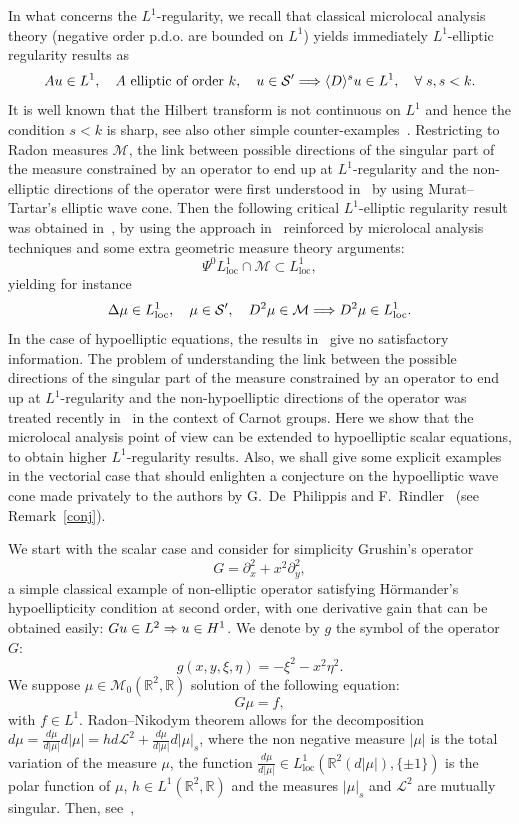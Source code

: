 \documentclass[10pt]{amsart}
\theoremstyle{definition}\newtheorem{defi}[theo]{Definition}\newtheorem{rema}[theo]{Remark}\newtheorem{exam}[theo]{Example}\newtheorem{exem}[theo]{Example}\newtheorem{nota}[theo]{Notation}
\DeclareMathOperator{\locc}{loc}
\newcommand{\bbR}{\mathbb{R}}
\newcommand{\clS}{\mathcal{S}}
\newcommand{\clM}{\mathcal{M}}
\newcommand{\clL}{\mathcal{L}}
\renewcommand*{\implies}{\mathchoice{\Longrightarrow}{\Rightarrow}{\Rightarrow}{\Rightarrow}}
\let\oldforall\forall
\renewcommand*{\forall}{\mathrel{\oldforall}}
\begin{document}
In what concerns the $L^1$-regularity, we recall that classical microlocal analysis theory (negative order p.d.o. are bounded on $L^1$) yields immediately $L^1$-elliptic regularity results as
\[
Au\in L^1,\quad A \text{ elliptic of order } k,\quad u\in \clS'\implies \langle D\rangle^s u\in L^1, \quad\forall s, s<k.
\]
It is well known that the Hilbert transform is not continuous on $L^1$ and hence the condition $s<k$ is sharp, see also other simple counter-examples~\cite[Example~7.5]{GM}. Restricting to Radon measures $\clM$, the link between possible directions of the singular part of the measure constrained by an operator to end up at $L^1$-regularity and the non-elliptic directions of the operator were first understood in~\cite{DePRi} by using Murat--Tartar's elliptic wave cone. Then the following critical $L^1$-elliptic regularity result was obtained in~\cite{BBWFL1}, by using the approach in~\cite{DePRi} reinforced by microlocal analysis techniques and some extra geometric measure theory arguments:
\begin{equation}\label{psi0L1}
\Psi^0L^1_{\locc}\cap\clM\subset L^1_{\locc},
\end{equation}
yielding for instance
\[
\Delta\mu\in L_{\locc}^1,\quad \mu\in \clS',\quad D^2\mu\in \clM\implies D^2\mu\in L^1_{\locc}.
\]
In the case of hypoelliptic equations, the results in~\cite{BBWFL1,DePRi} give no satisfactory information. The problem of understanding the link between the possible directions of the singular part of the measure constrained by an operator to end up at $L^1$-regularity and the non-hypoelliptic directions of the operator was treated recently in~\cite{A-sandwich} in the context of Carnot groups. Here we show that the microlocal analysis point of view can be extended to hypoelliptic scalar equations, to obtain higher $L^1$-regularity results. Also, we shall give some explicit examples in the vectorial case that should enlighten a conjecture on the hypoelliptic wave cone made privately to the authors by G.~De~Philippis and F.~Rindler~\cite{DePRiprep} (see Remark~\ref{conj}).

We start with the scalar case and consider for simplicity Grushin's operator
\[
G=\partial_{x}^2+x^2\partial_{y}^2,
\]
a simple classical example of non-elliptic operator satisfying H\"ormander's hypoellipticity condition at second order, with one derivative gain that can be obtained easily: $Gu\in L^2\implies u\in H^1$. We denote by $g$ the symbol of the operator $G$:
\[
g(x,y,\xi,\eta)=-\xi^2-x^2\eta^2.
\]
We suppose $\mu\in \clM_0(\bbR^2,\bbR)$ solution of the following equation:
\begin{equation}\label{Gru}
G\mu=f,
\end{equation}
with $f\in L^1$. Radon--Nikodym theorem allows for the decomposition $d\mu=\frac{d\mu}{d|\mu|}d|\mu|=hd\clL^2+\frac{d\mu}{d|\mu|}d|\mu|_s$, where the non negative measure $|\mu|$ is the total variation of the measure $\mu$, the function $\frac{d\mu}{d|\mu|}\in L^1_{\locc}(\bbR^2 (d|\mu|), \{\pm 1\})$ is the polar function of $\mu$, ${h\in L^1(\bbR^2,\bbR)}$ and the measures $|\mu|_s$ and $\clL^2$ are mutually singular. Then, see~\cite{DePRi},
\end{document}
